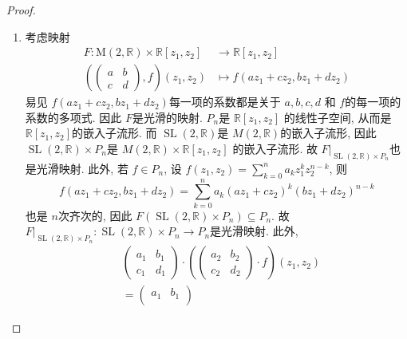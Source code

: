 \documentclass[../main.tex]{subfiles}
\begin{document}
\begin{proof}
    
\begin{enumerate}
    \item [a).] 考虑映射 \[
    \begin{aligned}
    F: \mathrm{M}\left( 2,\mathbb{R}  \right)\times \mathbb{R} [z_1,z_2]& \to \mathbb{R} [z_1,z_2] \\ 
    \left(  \begin{pmatrix} 
         a&b\\ 
          c&d 
     \end{pmatrix},f \right)\left( z_1,z_2 \right) &\mapsto   f\left( az_1+ cz_2,bz_1+ dz_2 \right)  
    \end{aligned}
    \]易见 \(  f\left( az_1+ cz_2,bz_1+ dz_2 \right)   \)每一项的系数都是关于 \(  a,b,c,d  \)  和 \(  f  \)的每一项的系数的多项式. 因此 \(  F  \)是光滑的映射. \(  P_{n}  \)是 \(  \mathbb{R} [z_1,z_2]  \)    的线性子空间, 从而是 \(  \mathbb{R} [z_1,z_2]  \)的嵌入子流形. 而 \(  \operatorname{SL}\left( 2,\mathbb{R}  \right)   \)是 \(  M\left( 2,\mathbb{R}  \right)   \)的嵌入子流形, 因此 \(  \operatorname{SL}\left( 2,\mathbb{R}  \right)\times P_{n}   \)是 \(  M\left( 2,\mathbb{R}  \right)   \times \mathbb{R} [z_1,z_2]\)     的嵌入子流形. 故 \(  F|_{\operatorname{SL}\left( 2,\mathbb{R}  \right)\times P_{n} }  \)也是光滑映射. 此外, 若 \(  f\in P_{n}  \), 设 \(  f\left( z_1,z_2 \right) = \sum _{k= 0}^{n}a_{k}z_1^{k} z_2^{n-k}  \), 则\[
      f\left( az_1+ cz_2, bz_1+ dz_2 \right)=    \sum _{k= 0}^{n}a_{k}\left( az_1+ cz_2 \right)^{k}\left( bz_1+ dz_2 \right)^{n-k}  
    \]也是 \(  n  \)次齐次的, 因此 \(  F\left( \operatorname{SL}\left( 2,\mathbb{R}  \right)\times P_{n}  \right)\subseteq P_{n}   \). 故 \(  F|_{\operatorname{SL}\left( 2,\mathbb{R}  \right)\times P_{n} }: \operatorname{SL}\left( 2,\mathbb{R}  \right)\times P_{n} \to P_{n}  \)是光滑映射. 此外,  \[
   \begin{aligned}
  &  \begin{pmatrix} 
        a_1&b_1\\ 
         c_1&d_1 
    \end{pmatrix}\cdot \left( \begin{pmatrix} 
       a_2&b_2\\ 
        c_2&d_2
    \end{pmatrix}\cdot f  \right)\left( z_1,z_2 \right)  \\ 
     & = \begin{pmatrix} 
        a_1&b_1\\ 

\end{pmatrix}
\end{aligned}\]
\end{enumerate}
\end{proof}
\end{document}
